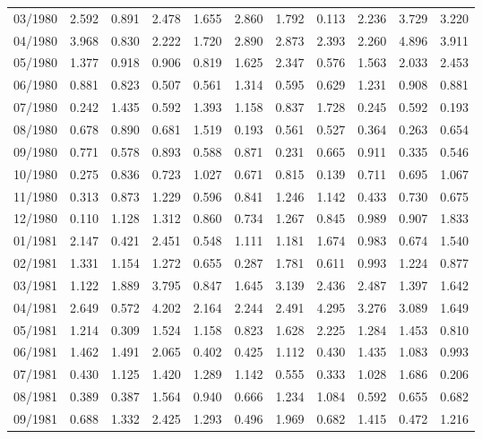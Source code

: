 \begin{tabular}{lrrrrrrrrrr}
03/1980 &  2.592 &  0.891 &  2.478 &  1.655 &  2.860 &  1.792 &  0.113 &  2.236 &  3.729 &  3.220 \\
04/1980 &  3.968 &  0.830 &  2.222 &  1.720 &  2.890 &  2.873 &  2.393 &  2.260 &  4.896 &  3.911 \\
05/1980 &  1.377 &  0.918 &  0.906 &  0.819 &  1.625 &  2.347 &  0.576 &  1.563 &  2.033 &  2.453 \\
06/1980 &  0.881 &  0.823 &  0.507 &  0.561 &  1.314 &  0.595 &  0.629 &  1.231 &  0.908 &  0.881 \\
07/1980 &  0.242 &  1.435 &  0.592 &  1.393 &  1.158 &  0.837 &  1.728 &  0.245 &  0.592 &  0.193 \\
08/1980 &  0.678 &  0.890 &  0.681 &  1.519 &  0.193 &  0.561 &  0.527 &  0.364 &  0.263 &  0.654 \\
09/1980 &  0.771 &  0.578 &  0.893 &  0.588 &  0.871 &  0.231 &  0.665 &  0.911 &  0.335 &  0.546 \\
10/1980 &  0.275 &  0.836 &  0.723 &  1.027 &  0.671 &  0.815 &  0.139 &  0.711 &  0.695 &  1.067 \\
11/1980 &  0.313 &  0.873 &  1.229 &  0.596 &  0.841 &  1.246 &  1.142 &  0.433 &  0.730 &  0.675 \\
12/1980 &  0.110 &  1.128 &  1.312 &  0.860 &  0.734 &  1.267 &  0.845 &  0.989 &  0.907 &  1.833 \\
01/1981 &  2.147 &  0.421 &  2.451 &  0.548 &  1.111 &  1.181 &  1.674 &  0.983 &  0.674 &  1.540 \\
02/1981 &  1.331 &  1.154 &  1.272 &  0.655 &  0.287 &  1.781 &  0.611 &  0.993 &  1.224 &  0.877 \\
03/1981 &  1.122 &  1.889 &  3.795 &  0.847 &  1.645 &  3.139 &  2.436 &  2.487 &  1.397 &  1.642 \\
04/1981 &  2.649 &  0.572 &  4.202 &  2.164 &  2.244 &  2.491 &  4.295 &  3.276 &  3.089 &  1.649 \\
05/1981 &  1.214 &  0.309 &  1.524 &  1.158 &  0.823 &  1.628 &  2.225 &  1.284 &  1.453 &  0.810 \\
06/1981 &  1.462 &  1.491 &  2.065 &  0.402 &  0.425 &  1.112 &  0.430 &  1.435 &  1.083 &  0.993 \\
07/1981 &  0.430 &  1.125 &  1.420 &  1.289 &  1.142 &  0.555 &  0.333 &  1.028 &  1.686 &  0.206 \\
08/1981 &  0.389 &  0.387 &  1.564 &  0.940 &  0.666 &  1.234 &  1.084 &  0.592 &  0.655 &  0.682 \\
09/1981 &  0.688 &  1.332 &  2.425 &  1.293 &  0.496 &  1.969 &  0.682 &  1.415 &  0.472 &  1.216 \\

\end{tabular}
